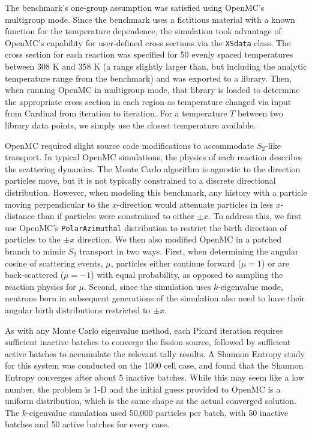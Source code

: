 \documentclass[letterpaper]{mc2023}
\begin{document}
The benchmark's one-group assumption was satisfied using OpenMC's multigroup mode. Since the benchmark uses a fictitious material
with a known function for the temperature dependence, the simulation took advantage of OpenMC's capability for user-defined
cross sections via the \texttt{XSdata} class. The cross section for each reaction was specified for 50 evenly spaced temperatures
between 308 K and 358 K (a range slightly larger than, but including the  analytic temperature range from the benchmark) and was
exported to a library. Then, when running OpenMC in multigroup mode, that library is loaded to determine the appropriate cross section
in each region as temperature changed via input from Cardinal from iteration to iteration. For a temperature $T$ between two library
data points, we simply use the closest temperature available.

OpenMC required slight source code modifications to accommodate $S_2$-like transport. In typical OpenMC simulations,
the physics of each reaction describes the scattering dynamics. The Monte Carlo algorithm is agnostic to the direction
particles move, but it is not typically constrained to a discrete directional distribution. However, when modeling this
benchmark, any history with a particle moving perpendicular to the $x$-direction would attenuate particles in less
$x$-distance than if particles were constrained to either $\pm x$. To address this, we first use OpenMC's \texttt{PolarAzimuthal}
distribution to restrict the birth direction of particles to the $\pm x$ direction. We then also modified OpenMC in a
patched branch to mimic $S_{2}$ transport in two ways. First, when determining the angular cosine of scattering events,
$\mu$, particles either continue forward ($\mu=1$) or are back-scattered ($\mu=-1$) with equal probability, as opposed to
sampling the reaction physics for $\mu$. Second, since the simulation uses $k$-eigenvalue mode, neutrons born in subsequent
generations of the simulation also need to have their angular birth distributions restricted to $\pm x$.

As with any Monte Carlo eigenvalue method, each Picard iteration requires sufficient inactive batches to converge the fission source,
followed by sufficient active batches to accumulate the relevant tally results. A Shannon Entropy \cite{brown-entropy-2006} study for
this system was conducted on the 1000 cell case, and found that the Shannon Entropy converges after about 5 inactive batches. While this
may seem like a low number, the problem is 1-D and the initial guess provided to OpenMC is a uniform distribution, which is the same
shape as the actual converged solution. The $k$-eigenvalue simulation used 50,000 particles per batch, with 50 inactive batches and
50 active batches for every case. 
\end{document}
